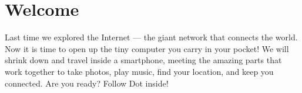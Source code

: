 \documentclass[11pt,openany]{book}
\begin{document}
\section*{Welcome}
Last time we explored the Internet — the giant network that connects the world.
Now it is time to open up the tiny computer you carry in your pocket!
We will shrink down and travel inside a smartphone, meeting the amazing parts
that work together to take photos, play music, find your location, and keep you connected.
Are you ready? Follow Dot inside!

\tableofcontents

\mainmatter











\backmatter
\end{document}

